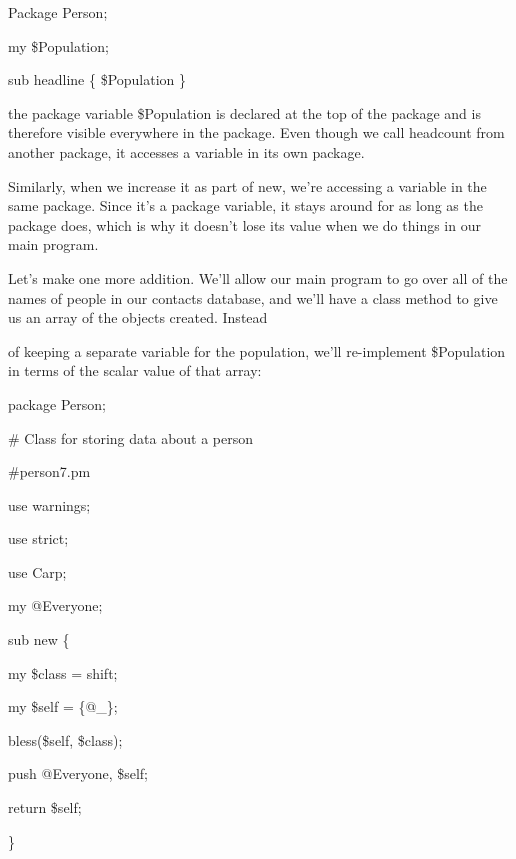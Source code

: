 \documentclass[a4paper,11pt]{book}
\begin{document}
\noindent 

\noindent Package Person;

\noindent my \$Population;

\noindent 

\noindent sub headline \{ \$Population \}

\noindent 

\noindent the package variable \$Population is declared at the top of the package and is therefore visible everywhere in the package. Even though we call headcount from another package, it accesses a variable in its own package.

\noindent 

\noindent Similarly, when we increase it as part of new, we're accessing a variable in the same package. Since it's a package variable, it stays around for as long as the package does, which is why it doesn't lose its value when we do things in our main program.

\noindent 

\noindent Let's make one more addition. We'll allow our main program to go over all of the names of people in our contacts database, and we'll have a class method to give us an array of the objects created. Instead

\noindent of keeping a separate variable for the population, we'll re-implement \$Population in terms of the scalar value of that array:

\noindent 

\noindent 

\noindent package Person;

\noindent \# Class for storing data about a person

\noindent \#person7.pm

\noindent use warnings;

\noindent use strict;

\noindent use Carp;

\noindent 

\noindent my @Everyone;

\noindent 

\noindent sub new \{

\noindent my \$class = shift;

\noindent my \$self = \{@\_\};

\noindent bless(\$self, \$class);

\noindent push @Everyone, \$self;

\noindent return \$self;

\noindent \}
\end{document}
